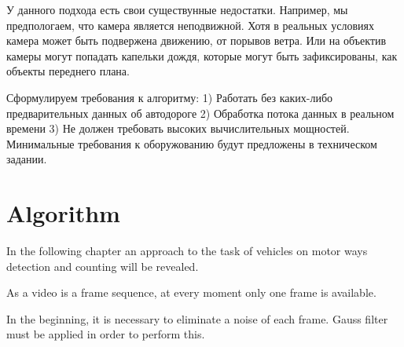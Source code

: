 \documentclass[12pt,a4paper,oneside,titlepage]{article}
\begin{document}
У данного подхода есть свои существунные недостатки.
Например, мы предпологаем, что камера является неподвижной.
Хотя в реальных условиях камера может быть подвержена движению, от порывов ветра.
Или на объектив камеры могут попадать капельки дождя, которые могут быть зафиксированы, как объекты переднего плана.



Сформулируем требования к алгоритму:
1) Работать без каких-либо предварительных данных об автодороге
2) Обработка потока данных в реальном времени
3) Не должен требовать высоких вычислительных мощностей. Минимальные требования к оборужованию будут предложены в техническом задании.
































\newpage
\section*{Algorithm}



In the following chapter an approach to the task of vehicles on motor ways detection and counting will be revealed.

As a video is a frame sequence, at every moment only one frame is available.

In the beginning, it is necessary to eliminate a noise of each frame.
Gauss filter must be applied in order to perform this.
\end{document}
